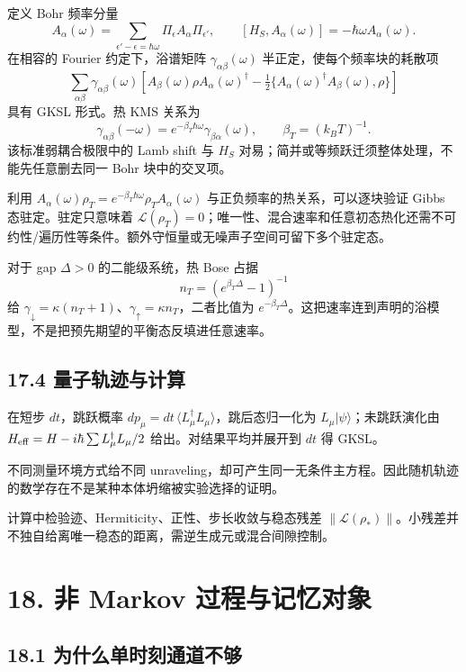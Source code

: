 \documentclass[
  11pt,
  oneside]{book}
\begin{document}
定义 Bohr 频率分量 \[
A_\alpha(\omega)=
\sum_{\epsilon'-\epsilon=\hbar\omega}
\Pi_\epsilon A_\alpha\Pi_{\epsilon'},
\qquad [H_S,A_\alpha(\omega)]=-\hbar\omega A_\alpha(\omega).
\] 在相容的 Fourier 约定下，浴谱矩阵 \(\gamma_{\alpha\beta}(\omega)\)
半正定，使每个频率块的耗散项 \[
\sum_{\alpha\beta}\gamma_{\alpha\beta}(\omega)
\left[A_\beta(\omega)\rho A_\alpha(\omega)^\dagger
-\tfrac12\{A_\alpha(\omega)^\dagger A_\beta(\omega),\rho\}\right]
\] 具有 GKSL 形式。热 KMS 关系为 \[
\gamma_{\alpha\beta}(-\omega)
=e^{-\beta_T\hbar\omega}\gamma_{\beta\alpha}(\omega),
\qquad \beta_T=(k_BT)^{-1}.
\] 该标准弱耦合极限中的 Lamb shift 与 \(H_S\)
对易；简并或等频跃迁须整体处理，不能先任意删去同一 Bohr 块中的交叉项。

利用
\(A_\alpha(\omega)\rho_T=e^{-\beta_T\hbar\omega}\rho_T A_\alpha(\omega)\)
与正负频率的热关系，可以逐块验证 Gibbs 态驻定。驻定只意味着
\(\mathcal L(\rho_T)=0\)；唯一性、混合速率和任意初态热化还需不可约性/遍历性等条件。额外守恒量或无噪声子空间可留下多个驻定态。

对于 gap \(\Delta>0\) 的二能级系统，热 Bose 占据 \[
n_T=(e^{\beta_T\Delta}-1)^{-1}
\] 给
\(\gamma_\downarrow=\kappa(n_T+1)\)、\(\gamma_\uparrow=\kappa n_T\)，二者比值为
\(e^{-\beta_T\Delta}\)。这把速率连到声明的浴模型，不是把预先期望的平衡态反填进任意速率。

\hypertarget{ux91cfux5b50ux8f68ux8ff9ux4e0eux8ba1ux7b97}{%
\section{17.4
量子轨迹与计算}\label{ux91cfux5b50ux8f68ux8ff9ux4e0eux8ba1ux7b97}}

在短步 \(dt\)，跳跃概率
\(dp_\mu=dt\,\langle L_\mu^\dagger L_\mu\rangle\)，跳后态归一化为
\(L_\mu|\psi\rangle\)；未跳跃演化由
\(H_{\rm eff}=H-i\hbar\sum L_\mu^\dagger L_\mu/2\)
给出。对结果平均并展开到 \(dt\) 得 GKSL。

不同测量环境方式给不同
unraveling，却可产生同一无条件主方程。因此随机轨迹的数学存在不是某种本体坍缩被实验选择的证明。

计算中检验迹、Hermiticity、正性、步长收敛与稳态残差
\(\|\mathcal L(\rho_*)\|\)。小残差并不独自给离唯一稳态的距离，需逆生成元或混合间隙控制。

\hypertarget{ch-18}{%
\chapter{18. 非 Markov 过程与记忆对象}\label{ch-18}}

\hypertarget{ux4e3aux4ec0ux4e48ux5355ux65f6ux523bux901aux9053ux4e0dux591f}{%
\section{18.1
为什么单时刻通道不够}\label{ux4e3aux4ec0ux4e48ux5355ux65f6ux523bux901aux9053ux4e0dux591f}}
\end{document}
